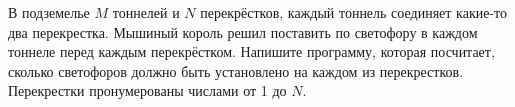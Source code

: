 В подземелье $M$ тоннелей и $N$ перекрёстков, каждый тоннель соединяет какие-то два перекрестка. Мышиный король решил поставить по светофору в каждом тоннеле перед каждым перекрёстком. Напишите программу, которая посчитает, сколько светофоров должно быть установлено на каждом из перекрестков. Перекрестки пронумерованы числами от 1 до $N$.
